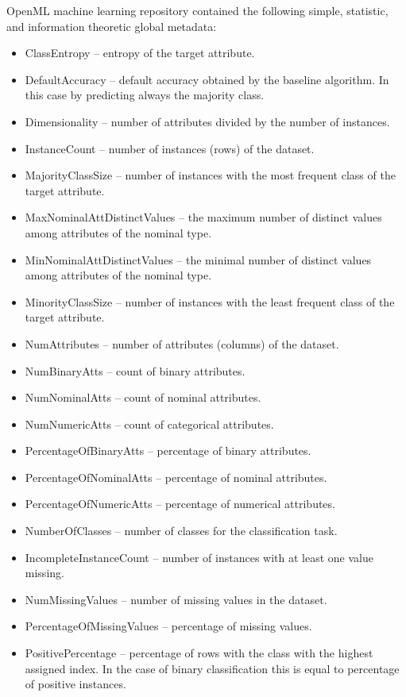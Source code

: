 OpenML machine learning repository contained the following simple, statistic, and information theoretic global metadata:
\begin{itemize}
	\item ClassEntropy -- entropy of the target attribute.
	\item DefaultAccuracy -- default accuracy obtained by the baseline algorithm. In this case by predicting always the majority class. 
	\item Dimensionality -- number of attributes divided by the number of instances.
	\item InstanceCount -- number of instances (rows) of the dataset.
	\item MajorityClassSize -- number of instances with the most frequent class of the target attribute.
	\item MaxNominalAttDistinctValues -- the maximum number of distinct values among attributes of the nominal type.
	\item MinNominalAttDistinctValues -- the minimal number of distinct values among attributes of the nominal type.
	\item MinorityClassSize -- number of instances with the least frequent class of the target attribute.
	\item NumAttributes -- number of attributes (columns) of the dataset.
	\item NumBinaryAtts -- count of binary attributes.
	\item NumNominalAtts -- count of nominal attributes.
	\item NumNumericAtts --  count of categorical attributes.
	\item PercentageOfBinaryAtts -- percentage of binary attributes.
	\item PercentageOfNominalAtts -- percentage of nominal attributes.
	\item PercentageOfNumericAtts -- percentage of numerical attributes.		
	\item NumberOfClasses --  number of classes for the classification task.
	\item IncompleteInstanceCount -- number of instances with at least one value missing.
	\item NumMissingValues -- number of missing values in the dataset.
	\item PercentageOfMissingValues -- percentage of missing values.
	\item PositivePercentage -- percentage of rows with the class with the highest assigned index. In the case of binary classification this is equal to percentage of positive instances.

\end{itemize}
